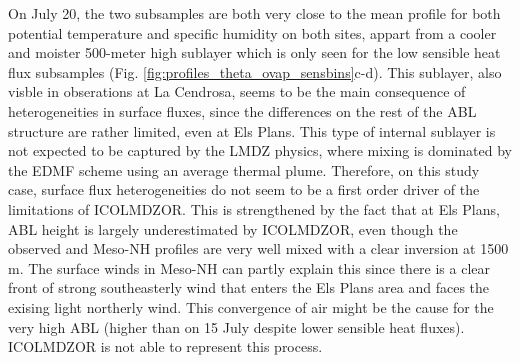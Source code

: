 On July 20, the two subsamples are both very close to the mean profile for both potential temperature and specific humidity on both sites, appart from a cooler and moister 500-meter high sublayer which is only seen for the low sensible heat flux subsamples (Fig. \ref{fig:profiles_theta_ovap_sensbins}c-d). This sublayer, also visble in obserations at La Cendrosa, seems to be the main consequence of heterogeneities in surface fluxes, since the differences on the rest of the ABL structure are rather limited, even at Els Plans.
This type of internal sublayer is not expected to be captured by the LMDZ physics, where mixing is dominated by the EDMF scheme using an average thermal plume. Therefore, on this study case, surface flux heterogeneities do not seem to be a first order driver of the limitations of ICOLMDZOR. This is strengthened by the fact that at Els Plans, ABL height is largely underestimated by ICOLMDZOR, even though the observed and Meso-NH profiles are very well mixed with a clear inversion at 1500 m.
The surface winds in Meso-NH can partly explain this since there is a clear front of strong southeasterly wind that enters the Els Plans area and faces the exising light northerly wind. This convergence of air might be the cause for the very high ABL (higher than on 15 July despite lower sensible heat fluxes). ICOLMDZOR is not able to represent this process.


